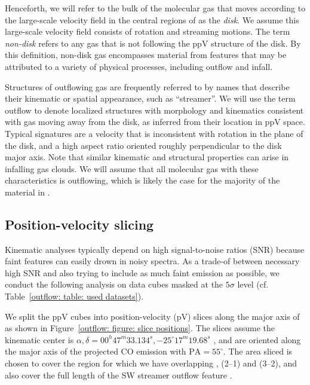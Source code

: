 Henceforth, we will refer to the bulk of the molecular gas that moves according to the large-scale velocity field in the central regions of  as the \emph{disk}. We assume this large-scale velocity field consists of rotation and streaming motions. The term \emph{non-disk} refers to any gas that is not following the ppV structure of the disk. By this definition, non-disk gas encompasses material from features that may be attributed to a variety of physical processes, including outflow and infall. 

Structures of outflowing gas are frequently referred to by names that describe their kinematic or spatial appearance, such as ``streamer''. We will use the term outflow to denote localized structures with morphology and kinematics consistent with gas moving away from the disk, as inferred from their location in ppV space. Typical signatures are a velocity that is inconsistent with rotation in the plane of the disk, and a high aspect ratio oriented roughly perpendicular to the disk major axis. Note that similar kinematic and structural properties can arise in infalling gas clouds. We will assume that all molecular gas with these characteristics is outflowing, which is likely the case for the majority of the material in .  


\subsection{Position-velocity slicing}
\label{outflow: subsection: slicing}

Kinematic analyses typically depend on high signal-to-noise ratios (SNR) because faint features can easily drown in noisy spectra. As a trade-of between necessary high SNR and also trying to include as much faint emission as possible, we conduct the following analysis on data cubes masked at the $5\sigma$ level (cf. Table~\ref{outflow: table: used datasets}).

We split the ppV cubes into position-velocity (pV) slices along the major axis of  as shown in Figure~\ref{outflow: figure: slice positions}. The slices assume the kinematic center is $\alpha,\delta = 00^h47^m33.134^s, -25^\circ17^m19.68^s$ \citep{MullerSanchez:2010dr}, and are oriented along the major axis of the projected CO emission with $\mathrm{PA} = 55^\circ$. The area sliced is chosen to cover the region for which we have overlapping , (2--1) and (3--2), and also cover the full length of the SW streamer outflow feature \citep[17.5\arcsec,][]{2017ApJ...835..265W}.

